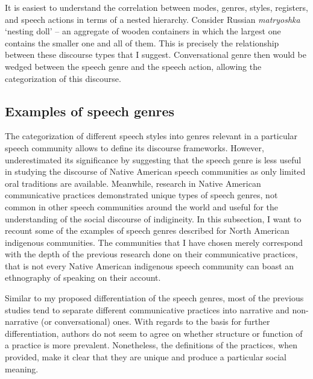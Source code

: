 \documentclass[12pt, draft]{article}
\begin{document}
It is easiest to understand the correlation between modes, genres, styles, registers, and speech actions in terms of a nested hierarchy. Consider Russian \textit{matryoshka} `nesting doll' -- an aggregate of wooden containers in which the largest one contains the smaller one and all of them. This is precisely the relationship between these discourse types that I suggest. Conversational genre then would be wedged between the speech genre and the speech action, allowing the categorization of this discourse.

\subsection{Examples of speech genres}
The categorization of different speech styles into genres relevant in a particular speech community allows to define its discourse frameworks. However, \textcite[p. 102]{dementyev2015} underestimated its significance by suggesting that the speech genre is less useful in studying the discourse of Native American speech communities as only limited oral traditions are available. Meanwhile, research in Native American communicative practices demonstrated unique types of speech genres, not common in other speech communities around the world and useful for the understanding of the social discourse of indigineity. In this subsection, I want to recount some of the examples of speech genres described for North American indigenous communities. The communities that I have chosen merely correspond with the depth of the previous research done on their communicative practices, that is not every Native American indigenous speech community can boast an ethnography of speaking on their account.

Similar to my proposed differentiation of the speech genres, most of the previous studies tend to separate different communicative practices into narrative and non-narrative (or conversational) ones. With regards to the basis for further differentiation, authors do not seem to agree on whether structure or function of a practice is more prevalent. Nonetheless, the definitions of the practices, when provided, make it clear that they are unique and produce a particular social meaning. 
\end{document}
